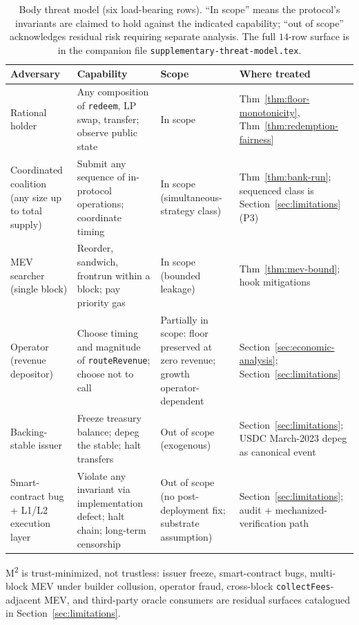 \begin{table}[t]
\centering
\footnotesize
\caption{Body threat model (six load-bearing rows). ``In scope'' means the protocol's invariants are claimed to hold against the indicated capability; ``out of scope'' acknowledges residual risk requiring separate analysis. The full $14$-row surface is in the companion file \texttt{supplementary-threat-model.tex}.}
\label{tab:threat-model-condensed}
\begin{tabular}{p{2.8cm} p{4.8cm} p{2.0cm} p{3.4cm}}
\toprule
\textbf{Adversary} & \textbf{Capability} & \textbf{Scope} & \textbf{Where treated} \\
\midrule
Rational holder & Any composition of \texttt{redeem}, LP swap, transfer; observe public state & In scope & Thm~\ref{thm:floor-monotonicity}, Thm~\ref{thm:redemption-fairness} \\
Coordinated coalition (any size up to total supply) & Submit any sequence of in-protocol operations; coordinate timing & In scope (simultaneous-strategy class) & Thm~\ref{thm:bank-run}; sequenced class is Section~\ref{sec:limitations} (P3) \\
MEV searcher (single block) & Reorder, sandwich, frontrun within a block; pay priority gas & In scope (bounded leakage) & Thm~\ref{thm:mev-bound}; hook mitigations \\
Operator (revenue depositor) & Choose timing and magnitude of \texttt{routeRevenue}; choose not to call & Partially in scope: floor preserved at zero revenue; growth operator-dependent & Section~\ref{sec:economic-analysis}; Section~\ref{sec:limitations} \\
Backing-stable issuer & Freeze treasury balance; depeg the stable; halt transfers & Out of scope (exogenous) & Section~\ref{sec:limitations}; USDC March-2023 depeg as canonical event \\
Smart-contract bug + L1/L2 execution layer & Violate any invariant via implementation defect; halt chain; long-term censorship & Out of scope (no post-deployment fix; substrate assumption) & Section~\ref{sec:limitations}; audit + mechanized-verification path \\
\bottomrule
\end{tabular}
\end{table}

M\textsuperscript{2} is trust-minimized, not trustless: issuer freeze, smart-contract bugs, multi-block MEV under builder collusion, operator fraud, cross-block \texttt{collectFees}-adjacent MEV, and third-party oracle consumers are residual surfaces catalogued in Section~\ref{sec:limitations}.
